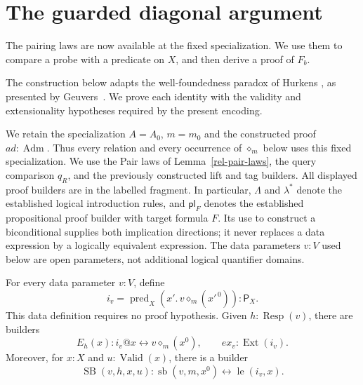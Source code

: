 \section{The guarded diagonal argument}
\label{rel-diagonal}

The pairing laws are now available at the fixed specialization. We use
them to compare a probe with a predicate on $X$, and then derive a proof
of $F_b$.

The construction below adapts the well-foundedness paradox of Hurkens
\cite{Hurkens1995}, as presented by Geuvers~\cite[Section~2]{Geuvers2007}.
We prove each identity with the validity and extensionality hypotheses
required by the present encoding.

We retain the specialization $A=A_0$, $m=m_0$ and the constructed
proof $ad:\operatorname{Adm}$.  Thus every relation and every occurrence
of $\diamond_m$ below uses this fixed specialization.  We use the Pair
laws of Lemma~\ref{rel-pair-laws}, the query comparison $q_R$, and the
previously constructed lift and tag builders.  All displayed proof
builders are in the labelled fragment.  In particular, $\Lambda$ and
$\lambda^*$ denote the established logical introduction rules, and
$\mathsf{pl}_F$ denotes the established propositional proof builder
with target formula $F$.  Its use to construct a biconditional supplies
both implication directions; it never replaces a data expression by
a logically equivalent expression.  The data parameters $v:V$ used
below are open parameters, not additional logical quantifier domains.

\begin{lemma}
\label{rel-response-predicate}
For every data parameter $v:V$, define
\[
 i_v=\operatorname{pred}_X(x'.\,v\diamond_m(x'^{\,0}))
       :\mathsf P_X.
\]
This data definition requires no proof hypothesis.  Given
$h:\operatorname{Resp}(v)$, there are builders
\[
 E_h(x):i_v@x\leftrightarrow v\diamond_m(x^0),
 \qquad ex_v:\operatorname{Ext}(i_v).
\]
Moreover, for $x:X$ and $u:\operatorname{Valid}(x)$, there is a builder
\begin{equation}
 \operatorname{SB}(v,h,x,u):
 \operatorname{sb}(v,m,x^0)\leftrightarrow
                         \operatorname{le}(i_v,x).
 \label{rel-sb-law}
\end{equation}
\end{lemma}


